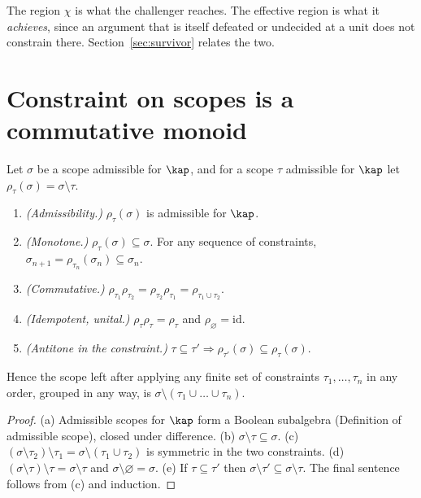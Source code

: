 The region $\chi$ is what the challenger reaches. The effective region is what it \emph{achieves}, since an argument that is itself defeated or undecided at a unit does not constrain there. Section~\ref{sec:survivor} relates the two.

\section{Constraint on scopes is a commutative monoid}

\begin{theorem}\label{thm:constraint}
Let $\sigma$ be a scope admissible for $\kap$, and for a scope $\tau$ admissible for $\kap$ let $\rho_\tau(\sigma)=\sigma\setminus\tau$.
\begin{enumerate}[label=(\alph*)]
\item \emph{(Admissibility.)} $\rho_\tau(\sigma)$ is admissible for $\kap$.
\item \emph{(Monotone.)} $\rho_\tau(\sigma)\subseteq\sigma$. For any sequence of constraints, $\sigma_{n+1}=\rho_{\tau_n}(\sigma_n)\subseteq\sigma_n$.
\item \emph{(Commutative.)} $\rho_{\tau_1}\rho_{\tau_2}=\rho_{\tau_2}\rho_{\tau_1}=\rho_{\tau_1\cup\tau_2}$.
\item \emph{(Idempotent, unital.)} $\rho_\tau\rho_\tau=\rho_\tau$ and $\rho_\varnothing=\mathrm{id}$.
\item \emph{(Antitone in the constraint.)} $\tau\subseteq\tau'\Rightarrow\rho_{\tau'}(\sigma)\subseteq\rho_\tau(\sigma)$.
\end{enumerate}
Hence the scope left after applying any finite set of constraints $\tau_1,\dots,\tau_n$ in any order, grouped in any way, is $\sigma\setminus(\tau_1\cup\dots\cup\tau_n)$.
\end{theorem}

\begin{proof}
(a) Admissible scopes for $\kap$ form a Boolean subalgebra (Definition of admissible scope), closed under difference. (b) $\sigma\setminus\tau\subseteq\sigma$. (c) $(\sigma\setminus\tau_2)\setminus\tau_1=\sigma\setminus(\tau_1\cup\tau_2)$ is symmetric in the two constraints. (d) $(\sigma\setminus\tau)\setminus\tau=\sigma\setminus\tau$ and $\sigma\setminus\varnothing=\sigma$. (e) If $\tau\subseteq\tau'$ then $\sigma\setminus\tau'\subseteq\sigma\setminus\tau$. The final sentence follows from (c) and induction.
\end{proof}

